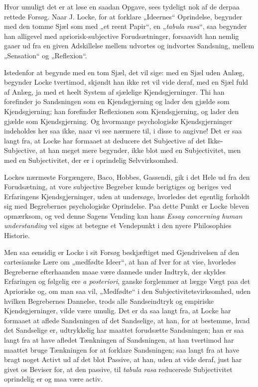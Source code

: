 \documentclass[11pt]{book}
\newcommand{\opage}[1]{\marginnote{\footnotesize\textit{[#1]}}}
\begin{document}
Hvor umuligt det er at løse en saadan Opgave, sees tydeligt nok af
de derpaa rettede Forsøg. Naar J. Locke, for at forklare „Ideernes“
Oprindelse, begynder med den tomme Sjæl som med „et reent Papir“, en
„\textit{tabula rasa}“, saa
\opage{25} \setcounter{footnote}{0}%
begynder han alligevel med apriorisk-subjective Forudsætninger,
forsaavidt han nemlig gaaer ud fra en given Adskillelse mellem
udvortes og indvortes Sandsning, mellem „Sensation“ og „Reflexion“.

Istedenfor at begynde med en tom Sjæl, det vil sige: med en Sjæl
uden Anlæg, begynder Locke tvertimod, skjøndt han ikke ret vil vide
deraf, med en Sjæl fuld af Anlæg, ja med et heelt System af sjælelige
Kjendsgjerninger. Thi han forefinder jo Sandsningen som en
Kjendsgjerning og lader den gjælde som Kjendsgjerning; han forefinder
Reflexionen som Kjendsgjerning, og lader den gjælde som
Kjendsgjerning. Og hvormange psychologiske Kjendsgjerninger
indeholdes her saa ikke, naar vi see nærmere til, i disse to angivne!
Det er saa langt fra, at Locke har formaaet at deducere det
Subjective af det Ikke-Subjective, at han meget mere begynder, ikke
blot med en Subjectivitet, men med en Subjectivitet, der er i
oprindelig Selvvirksomhed.

Lockes nærmeste Forgængere, Baco, Hobbes, Gassendi, gik i det Hele
ud fra den Forudsætning, at vore subjective Begreber kunde berigtiges
og beriges ved Erfaringens Kjendsgjerninger, uden at undersøge,
hvorledes det egentlig forholdt sig med Begrebernes psychologiske
Oprindelse. Paa dette Punkt er Locke bleven opmærksom, og ved denne
Sagens Vending kan hans \textit{Essay concerning human understanding}
vel siges at betegne et Vendepunkt i den nyere Philosophies Historie.

Men saa eensidig er Locke i sit Forsøg beskjæftiget med
Gjendrivelsen af den cartesianske Lære om „medfødte Ideer“, at han af
Iver for at vise, hvorledes Begreberne efterhaanden maae være dannede
under Indtryk, der skyldes Erfaringen og følgelig ere \textit{a
posteriori}, ganske forglemmer at lægge Vægt paa det Aprioriske og,
om man saa vil, „Medfødte“ i den Subjectivitetsvirksomhed, uden
hvilken Begrebernes Dannelse, trods alle Sandseindtryk og empiriske
Kjendsgjerninger, vilde være
\opage{26} \setcounter{footnote}{0}%
umulig. Det er da saa langt fra, at Locke har formaaet at aflede
Sandsningen af det Sandselige, at han, for at bestemme, hvad det
Sandselige er, udtrykkelig har maattet forudsætte Sandsningen; han er
saa langt fra at have afledet Tænkningen af Sandsningen, at han
tvertimod har maattet bruge Tænkningen for at forklare Sandsningen;
saa langt fra at have bragt noget Activt ud af det blot Passive, at
han, uden at vide deraf, just har givet os Beviser for, at den
passive, til \textit{tabula rasa} reducerede Subjectivitet oprindelig
er og maa være activ.
\end{document}
